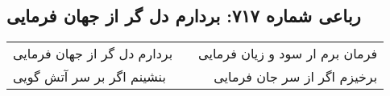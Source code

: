 \begin{center}
\section*{رباعی شماره ۷۱۷: بردارم دل گر از جهان فرمایی}
\label{sec:sh717}
\begin{longtable}{l p{0.5cm} r}
بردارم دل گر از جهان فرمایی
&&
فرمان برم ار سود و زیان فرمایی
\\
بنشینم اگر بر سر آتش گویی
&&
برخیزم اگر از سر جان فرمایی
\\
\end{longtable}
\end{center}
